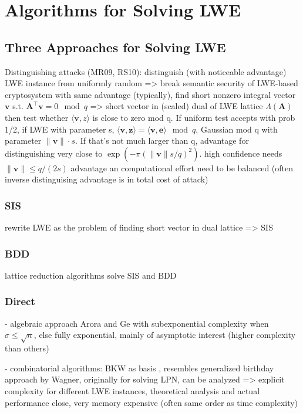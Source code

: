 {\section{Algorithms for Solving LWE}
\subsection{Three Approaches for Solving LWE}
Distinguishing attacks (MR09, RS10): distinguish (with noticeable advantage) LWE instance from uniformly random => break semantic security of LWE-based cryptosystem with same advantage (typically), find short nonzero integral vector $\mathbf{v}$ s.t. $\mathbf{A}^\intercal \mathbf{v} = 0 \mod q$ => short vector in (scaled) dual of LWE lattice $\Lambda(\mathbf{A})$ %
then test whether $\langle \mathbf{v}, z \rangle$ is close to zero mod q. If uniform test accepts with prob 1/2, if LWE with parameter s, $\langle \mathbf{v}, \mathbf{z} \rangle = \langle \mathbf{v}, \mathbf{e} \rangle \mod q$, Gaussian mod q with parameter $\| \mathbf{v} \| \cdot s$. If that's not much larger than q, advantage for distinguishing very close to $\exp(-\pi (\| \mathbf{v} \| s/q)^2)$. high confidence needs $\| \mathbf{v} \| \leq q/(2s)$ 
advantage an computational effort need to be balanced (often inverse distinguising advantage is in total cost of attack)

\subsubsection{SIS}
rewrite LWE as the problem of finding short vector in dual lattice => SIS
\subsubsection{BDD}

lattice reduction algorithms solve SIS and BDD 
\subsubsection{Direct}

- algebraic approach Arora and Ge with subexponential complexity when $\sigma \leq \sqrt{n}$, else fully exponential, mainly of asymptotic interest (higher complexity than others)

- combinatorial algorithms: BKW as basis \cite{BKW03}, resembles generalized birthday approach by Wagner, %
originally for solving LPN, can be analyzed => explicit complexity for different LWE instances, theoretical analysis and actual performance close,
very memory expensive (often same order as time complexity) 

}
